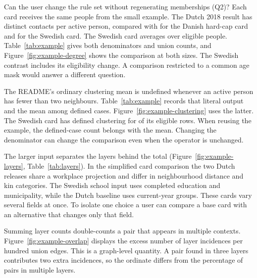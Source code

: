 Can the user change the rule set without regenerating memberships (Q2)? Each card receives the same \SmallPeople{} people from the small example. The Dutch 2018 result has \SmallDutchDegree{} distinct contacts per active person, compared with \SmallDanishDegree{} for the Danish hard-cap card and \SmallSwedishDegree{} for the Swedish card. The Swedish card averages over \SmallSwedishActive{} eligible people. Table~\ref{tab:example} gives both denominators and union counts, and Figure~\ref{fig:example-degree} shows the comparison at both sizes. The Swedish contrast includes its eligibility change. A comparison restricted to a common age mask would answer a different question.


The README's ordinary clustering mean is undefined whenever an active person has fewer than two neighbours. Table~\ref{tab:example} records that literal output and the mean among defined cases. Figure~\ref{fig:example-clustering} uses the latter. The Swedish card has defined clustering for \SmallSwedishDefined{} of its \SmallSwedishActive{} eligible rows. When reusing the example, the defined-case count belongs with the mean. Changing the denominator can change the comparison even when the operator is unchanged.

The larger input separates the layers behind the total (Figure~\ref{fig:example-layers}, Table~\ref{tab:layers}). In the simplified card comparison the two Dutch releases share a workplace projection and differ in neighbourhood distance and kin categories. The Swedish school input uses completed education and municipality, while the Dutch baseline uses current-year groups. These cards vary several fields at once. To isolate one choice a user can compare a base card with an alternative that changes only that field.


Summing layer counts double-counts a pair that appears in multiple contexts. Figure~\ref{fig:example-overlap} displays the excess number of layer incidences per hundred union edges. This is a graph-level quantity. A pair found in three layers contributes two extra incidences, so the ordinate differs from the percentage of pairs in multiple layers.

